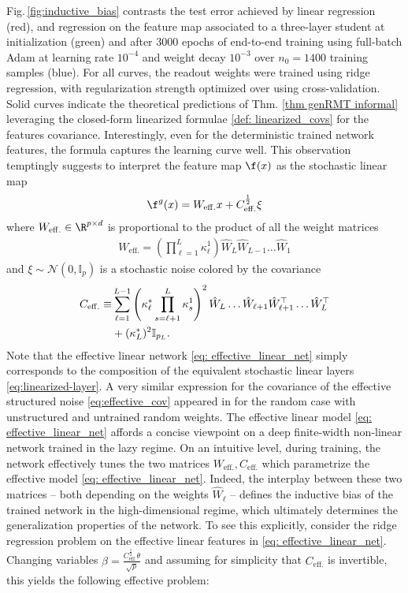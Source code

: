 Fig.\,\ref{fig:inductive_bias} contrasts the test error achieved by linear regression (red), and regression on the feature map associated to a three-layer student at initialization (green) and after $3000$ epochs of end-to-end training using full-batch Adam \cite{kingma2014adam} at learning rate $10^{-4}$ and weight decay $10^{-3}$ over $n_0=1400$ training samples (blue). For all curves, the readout weights were trained using ridge regression, with regularization strength optimized over using cross-validation. Solid curves indicate the theoretical predictions of Thm. \ref{thm genRMT informal} leveraging the closed-form linearized formulae \ref{def: linearized_covs} for the features covariance. Interestingly, even for the deterministic trained network features, the formula captures the learning curve well. This observation temptingly suggests to interpret the feature map $\f(x)$ as the stochastic linear map
\begin{align}
 \label{eq: effective_linear_net}
 \f^g(x)=W_{\mathrm{eff.}}x+C_{\mathrm{eff.}}^{\frac{1}{2}}\xi
\end{align}
where $W_{\mathrm{eff.}}\in\R^{p\times d}$ is proportional to the product of all the weight matrices
\begin{align}
    W_{\mathrm{eff.}}=\left(\prod\limits_{\ell=1}^L \kappa^1_\ell\right) \hat{W}_L\hat{W}_{L-1}\dots \hat{W}_1 
\end{align}
and $\xi\sim\mathcal{N}(0,\mathbb{I}_p)$ is a stochastic noise colored by the covariance
\begin{align}
    \label{eq:effective_cov}
    C_{\mathrm{eff.}}\equiv & \sum\limits_{\ell=1}^{L-1}
    \left(\kappa^*_\ell\prod\limits_{s=\ell+1}^L
    \kappa_s^1
    \right)^2  \hat{W}_L\dots \hat{W}_{\ell+1}\hat{W}_{\ell+1}^\top\dots \hat{W}_L^\top\notag \\
                    & +  (\kappa^*_L)^2\mathbb{I}_{p_L}.
\end{align}
Note that the effective linear network \eqref{eq: effective_linear_net} simply corresponds to the composition of the equivalent stochastic linear layers \eqref{eq:linearized-layer}. A very similar expression for the covariance of the effective structured noise \eqref{eq:effective_cov} appeared in \cite{schroder2023deterministic} for the random case with unstructured and untrained random weights. The effective linear model \eqref{eq: effective_linear_net} affords a concise viewpoint on a deep finite-width non-linear network trained in the lazy regime. On an intuitive level, during training, the network effectively tunes the two matrices $W_{\mathrm{eff.}},C_{\mathrm{eff.}}$ which parametrize the effective model \eqref{eq: effective_linear_net}. Indeed, the interplay between these two matrices -- both depending on the weights $\hat{W}_{\ell}$ -- defines the inductive bias of the trained network in the high-dimensional regime, which ultimately determines the generalization properties of the network. To see this explicitly, consider the ridge regression problem on the effective linear features in \cref{eq: effective_linear_net}. Changing variables $\beta = \frac{C_{\mathrm{eff.}}^{\frac{1}{2}}\theta}{\sqrt{p}}$ and assuming for simplicity that $C_{\mathrm{eff.}}$ is invertible, this yields the following effective problem:
